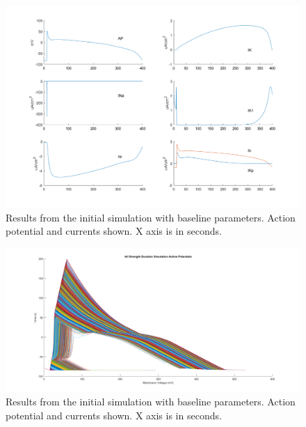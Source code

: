 \documentclass[12pt]{article}
\begin{document}
\begin{figure}[H]
	
	\centering	
	\includegraphics[width = 1\textwidth]{baseResults.png}
	\caption{ Results from the initial simulation with baseline parameters. Action potential and currents shown. X axis is in seconds. }
	\label{fig:Initial}
\end{figure}

\begin{figure}[H]
	
	\centering	
	\includegraphics[width = 1\textwidth]{AllSimAP.png}
	\caption{ Results from the initial simulation with baseline parameters. Action potential and currents shown. X axis is in seconds. }
	\label{fig:AllStrDurAP}
\end{figure}
\end{document}
